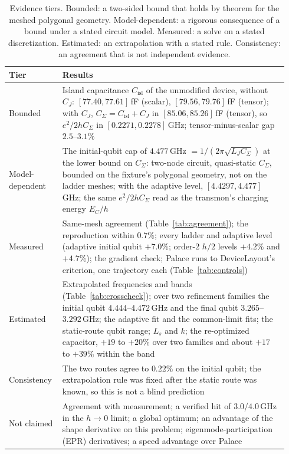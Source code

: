 \documentclass{anvil-paper}
\newcommand{\Cisl}{C_{\mathrm{isl}}}
\begin{document}
\begin{table}[htbp]
  \centering
  \caption{Evidence tiers. Bounded: a two-sided bound that holds by theorem
  for the meshed polygonal geometry. Model-dependent: a rigorous consequence of a
  bound under a stated circuit model. Measured: a solve on a stated
  discretization. Estimated: an extrapolation with a stated rule.
  Consistency: an agreement that is not independent evidence.}
  \label{tab:tiers}
  \footnotesize
  \begin{tabular}{@{}>{\raggedright\arraybackslash}p{0.17\linewidth}>{\raggedright\arraybackslash}p{0.77\linewidth}@{}}
    \toprule
    Tier & Results \\
    \midrule
    Bounded & Island capacitance $\Cisl$ of the unmodified device, without $C_J$: $[77.40, 77.61]$\,fF (scalar), $[79.56, 79.76]$\,fF (tensor); with $C_J$, $C_\Sigma = \Cisl + C_J$ in $[85.06, 85.26]$\,fF (tensor), so $e^2/2hC_\Sigma$ in $[0.2271, 0.2278]$\,GHz; tensor-minus-scalar gap $2.5$--$3.1\%$ \\
    Model-dependent & The initial-qubit cap of $4.477$\,GHz $= 1/(2\pi\sqrt{L_J C_\Sigma})$ at the lower bound on $C_\Sigma$: two-node circuit, quasi-static $C_\Sigma$, bounded on the fixture's polygonal geometry, not on the ladder meshes; with the adaptive level, $[4.4297, 4.477]$\,GHz; the same $e^2/2hC_\Sigma$ read as the transmon's charging energy $E_C/h$ \\
    Measured & Same-mesh agreement (Table~\ref{tab:agreement}); the reproduction within $0.7\%$; every ladder and adaptive level (adaptive initial qubit $+7.0\%$; order-2 $h/2$ levels $+4.2\%$ and $+4.7\%$); the gradient check; Palace runs to DeviceLayout's criterion, one trajectory each (Table~\ref{tab:controls}) \\
    Estimated & Extrapolated frequencies and bands (Table~\ref{tab:crosscheck}); over two refinement families the initial qubit $4.444$--$4.472$\,GHz and the final qubit $3.265$--$3.292$\,GHz; the adaptive fit and the common-limit fits; the static-route qubit range; $L_s$ and $k$; the re-optimized capacitor, $+19$ to $+20\%$ over two families and about $+17$ to $+39\%$ within the band \\
    Consistency & The two routes agree to $0.22\%$ on the initial qubit; the extrapolation rule was fixed after the static route was known, so this is not a blind prediction \\
    Not claimed & Agreement with measurement; a verified hit of $3.0$/$4.0$\,GHz in the $h \to 0$ limit; a global optimum; an advantage of the shape derivative on this problem; eigenmode-participation (EPR) derivatives; a speed advantage over Palace \\
    \bottomrule
  \end{tabular}
\end{table}
\end{document}
